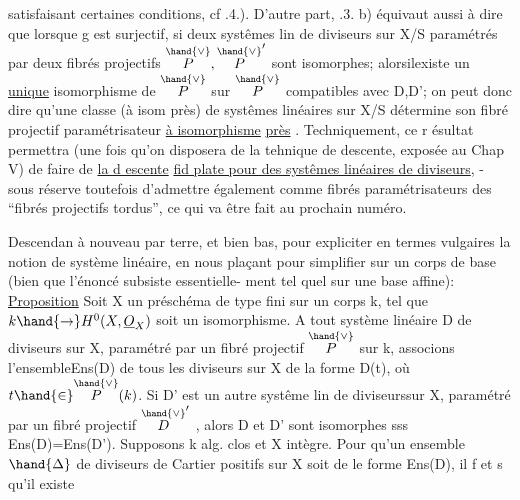 
satisfaisant certaines conditions, cf .4.). D'autre part, .3. b)
équivaut  aussi à dire que lorsque g est surjectif, si deux systêmes lin de diviseurs
sur X/S  paramétrés par deux fibrés projectifs $\overset{\hand{\vee}}{P},\overset{\hand{\vee}}{P}'$ sont isomorphes;
alorsilexiste un \uline{unique} isomorphisme de $\overset{\hand{\vee}}{P}$ sur $\overset{\hand{\vee}}{P}$ compatibles avec D,D';
on peut donc dire qu'une classe (à isom près) de systêmes linéaires sur
X/S détermine son fibré projectif paramétrisateur \uline{à isomorphisme} 
\uline{près} . Techniquement, ce r ésultat permettra (une fois qu'on disposera
de la tehnique de descente, exposée au Chap V) de faire de \uline{la d escente}
\uline{fid plate pour des systêmes linéaires de diviseurs}, - sous réserve
 toutefois d'admettre également comme fibrés paramétrisateurs des ``fibrés projectifs
tordus'', ce qui va être fait au prochain  numéro.

Descendan à nouveau par terre, et bien bas, pour expliciter en
termes vulgaires la notion de système linéaire, en nous plaçant pour
simplifier sur un corps de base (bien que l'énoncé subsiste essentielle-%
ment tel quel sur une base affine):
\uline{Proposition}  Soit X un préschéma   de type fini sur un corps k,
tel que $k\hand{\to} H^0(X,\underline{O}_X)$ soit un isomorphisme. A tout système linéaire D de
diviseurs  sur X, paramétré par un fibré projectif $\overset{\hand{\vee}}{P}$ sur k, associons
l'ensemble\hand{(!)}Ens(D) de tous les diviseurs sur X de la forme D(t), où
$t\hand{\in}\overset{\hand{\vee}}{P}(k)$.  Si  D' est un autre systême lin de diviseurssur X, paramétré par un
fibré projectif $\overset{\hand{\vee}}{D}'$ , alors D et D' sont isomorphes sss Ens(D)=Ens(D').
 Supposons k alg. clos et X  intègre.
\hand{(}Pour qu'un ensemble $\hand{\Delta}$ de diviseurs de Cartier positifs sur X soit de
le forme Ens(D), il f et s qu'il existe 

